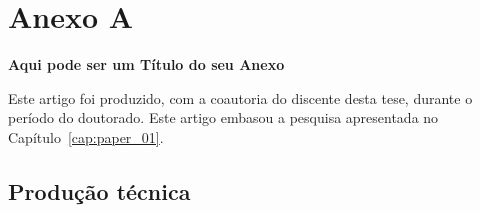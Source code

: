 \chapter{Anexo A}
\label{an:a}
\begin{center}
    \textbf{Aqui pode ser um Título do seu Anexo}
\end{center}

Este artigo foi produzido, com a coautoria do discente desta tese, durante o período do doutorado. Este artigo embasou a pesquisa apresentada no Capítulo~\ref{cap:paper_01}.


\section{Produção técnica}

